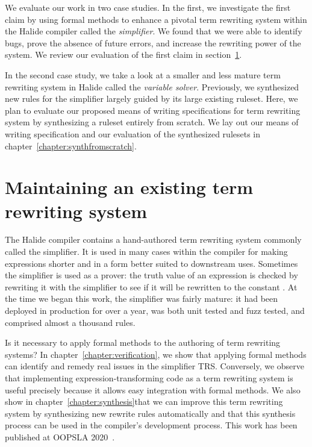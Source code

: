 We evaluate our work in two case studies. In the first, we investigate the first claim by using formal methods to enhance a pivotal term rewriting system within the Halide compiler called the \emph{simplifier}. We found that we were able to identify bugs, prove the absence of future errors, and increase the rewriting power of the system. We review our evaluation of the first claim in section~\ref{sec:prior}. 

In the second case study, we take a look at a smaller and less mature term rewriting system in Halide called the \emph{variable solver}. Previously, we synthesized new rules for the simplifier largely guided by its large existing ruleset. Here, we plan to evaluate our proposed means of writing specifications for term rewriting system by synthesizing a ruleset entirely from scratch. We lay out our means of writing specification and our evaluation of the synthesized rulesets in chapter~\ref{chapter:synthfromscratch}.

\section{Maintaining an existing term rewriting system}
\label{sec:prior}

The Halide compiler contains a hand-authored term rewriting system commonly called the simplifier. It is used in many cases within the compiler for making expressions shorter and in a form better suited to downstream uses. Sometimes the simplifier is used as a prover: the truth value of an expression is checked by rewriting it with the simplifier to see if it will be rewritten to the constant \htrue. At the time we began this work, the simplifier was fairly mature: it had been deployed in production for over a year, was both unit tested and fuzz tested, and comprised almost a thousand rules.

Is it necessary to apply formal methods to the authoring of term rewriting systems? In chapter~\ref{chapter:verification}, we show that applying formal methods can identify and remedy real issues in the simplifier TRS. Conversely, we observe that implementing expression-transforming code as a term rewriting system is useful precisely because it allows easy integration with formal methods. We also show in chapter~\ref{chapter:synthesis}that we can improve this term rewriting system by synthesizing new rewrite rules automatically and that this synthesis process can be used in the compiler's development process. This work has been published at OOPSLA 2020~\citep{newcomb2020verifying}.

